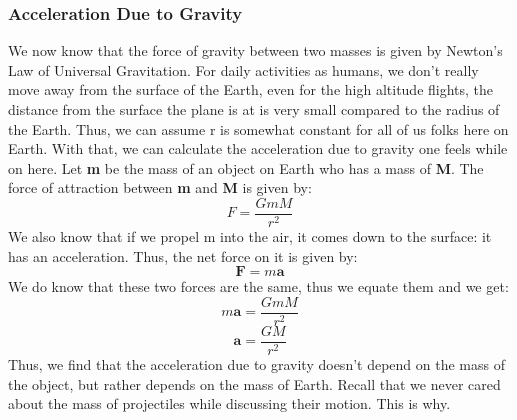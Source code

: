 \documentclass[9pt]{article}
\begin{document}
	\subsubsection*{Acceleration Due to Gravity}
	We now know that the force of gravity between two masses is given by Newton's Law of Universal Gravitation. For daily activities as humans, we don't really move away from the surface of the Earth, even for the high altitude flights, the distance from the surface the plane is at is very small compared to the radius of the Earth. Thus, we can assume r is somewhat constant for all of us folks here on Earth. With that, we can calculate the acceleration due to gravity one feels while on here. Let \textbf{m} be the mass of an object on Earth who has a mass of \textbf{M}. The force of attraction between \textbf{m} and \textbf{M} is given by:
	$$F=\dfrac{GmM}{r^2}$$
	We also know that if we propel m into the air, it comes down to the surface: it has an acceleration. Thus, the net force on it is given by:
	$$\textbf{F}=m\textbf{a}$$
	We do know that these two forces are the same, thus we equate them and we get:
	$$m\textbf{a}=\dfrac{GmM}{r^2}$$	
	$$\textbf{a}=\dfrac{GM}{r^2}$$	
	Thus, we find that the acceleration due to gravity  doesn't depend on the mass of the object, but rather depends on the mass of Earth. Recall that we never cared about the mass of projectiles while discussing their motion. This is why.
\end{document}
